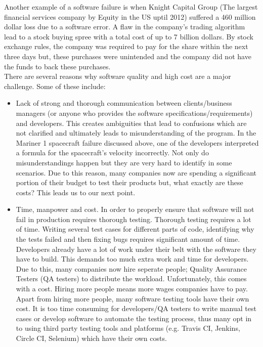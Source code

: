 \documentclass[12pt]{article}
\begin{document}
\begin{enumerate}[(a)]
Another example of a software failure is when Knight Capital Group (The largest financial services company by Equity in the US uptil 2012) suffered a 460 million dollar loss due to a software error. A flaw in the company's trading algorithm lead to a stock buying spree with a total cost of up to 7 billion dollars. By stock exchange rules, the company was required to pay for the share within the next three days but, these purchases were unintended and the company did not have the funds to back these purchases. \\
There are several reasons why software quality and high cost are a major challenge. Some of these include:

\begin{itemize}
\item Lack of strong and thorough communication between clients/business managers (or anyone who provides the software specifications/requirements) and developers. This creates ambiguities that lead to confusions which are not clarified and ultimately leads to misunderstanding of the program. In the Mariner 1 spacecraft failure discussed above, one of the developers interpreted a formula for the spacecraft's velocity incorrectly. Not only do misunderstandings happen but they are very hard to identify in some scenarios. Due to this reason, many companies now are spending a significant portion of their budget to test their products but, what exactly are these costs? This leads us to our next point.

\item Time, manpower and cost. In order to properly ensure that software will not fail in production requires thorough testing. Thorough testing requires a lot of time. Writing several test cases for different parts of code, identifying why the tests failed and then fixing bugs requires significant amount of time. Developers already have a lot of work under their belt with the software they have to build. This demands too much extra work and time for developers. Due to this, many companies now hire seperate people; Quality Assurance Testers (QA testers) to distribute the workload. Unfortunately, this comes with a cost. Hiring more people means more wages companies have to pay. Apart from hiring more people, many software testing tools have their own cost. It is too time consuming for developers/QA testers to write manual test cases or develop software to automate the testing process, thus many opt in to using third party testing tools and platforms (e.g. Travis CI, Jenkins, Circle CI, Selenium) which have their own costs.


\end{itemize}
\end{enumerate}
\end{document}
